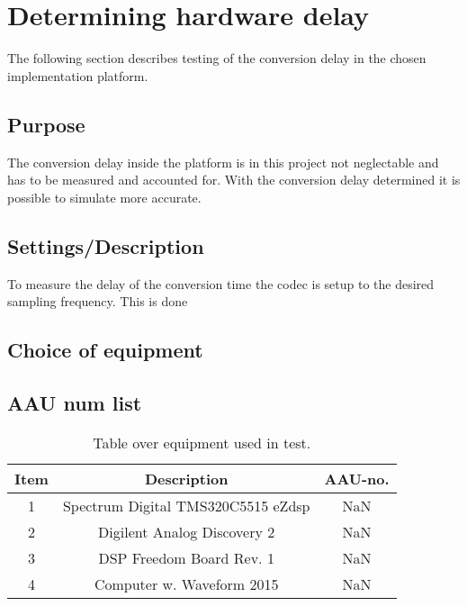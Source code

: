 \section{Determining hardware delay} \label{sec:HardwareDelay}

The following section describes testing of the conversion delay in the chosen implementation platform.

\subsection{Purpose}

The conversion delay inside the platform is in this project not neglectable and has to be measured and accounted for. With the conversion delay determined it is possible to simulate more accurate. %


\subsection{Settings/Description}

To measure the delay of the conversion time the codec is setup to the desired sampling frequency. This is done 


\subsection{Choice of equipment}


\subsection{AAU num list}

\begin{table}[H]
	\centering
	\begin{tabular}{ c c c } \toprule
		{Item}	& {Description} 						& {AAU-no}. \\ \bottomrule 
		1	&	Spectrum Digital TMS320C5515 eZdsp	& NaN	\\
		2	&	Digilent Analog Discovery 2	& NaN		\\
		3	&	DSP Freedom Board Rev. 1 & NaN		\\
		4	&	Computer w. Waveform 2015					& NaN		\\
		\bottomrule
	\end{tabular}
	\caption{Table over equipment used in test.}
	\label{tab:MeasDelayTable}
\end{table}

